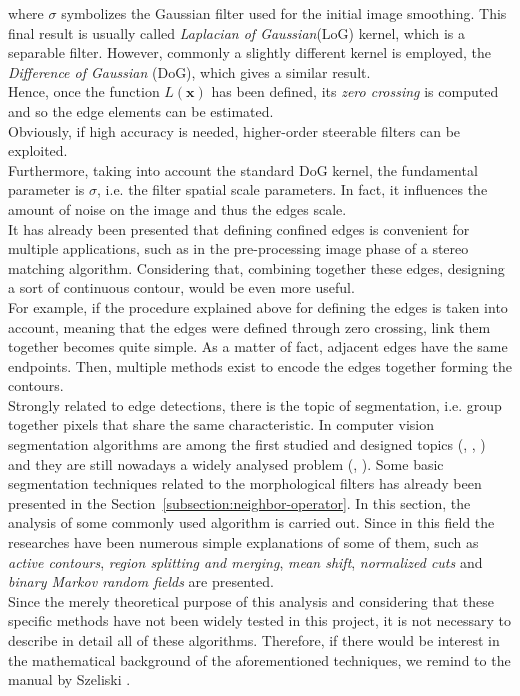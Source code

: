 where $\sigma$ symbolizes the Gaussian filter used for the initial image smoothing.
This final result is usually called \textit{Laplacian of Gaussian}(LoG) kernel, which is a separable filter.
However, commonly a slightly different kernel is employed, the \textit{Difference of Gaussian} (DoG), which gives a similar result.\\
Hence, once the function $L(\mathbf{x})$ has been defined, its \textit{zero crossing} is computed and so the edge elements can be estimated. \\
Obviously, if high accuracy is needed, higher-order steerable filters can be exploited.\\
Furthermore, taking into account the standard DoG kernel, the fundamental parameter is $\sigma$, i.e. the filter spatial scale parameters.
In fact, it influences the amount of noise on the image and thus the edges scale. \\
It has already been presented that defining confined edges is convenient for multiple applications, such as in the pre-processing image phase of a stereo matching algorithm.
Considering that, combining together these edges, designing a sort of continuous contour, would be even more useful.\\
For example, if the procedure explained above for defining the edges is taken into account, meaning that the edges were defined through zero crossing, link them together becomes quite simple. 
As a matter of fact, adjacent edges have the same endpoints. 
Then, multiple methods exist to encode the edges together forming the contours.\\
Strongly related to edge detections, there is the topic of segmentation, i.e. group together pixels that share the same characteristic.
In computer vision segmentation algorithms are among the first studied and designed topics (\cite{ohlander1978picture}, \cite{Brice1970}, \cite{haralick1985image}) and they are still nowadays a widely analysed problem (\cite{comaniciu2002mean}, \cite{cremers2007review}). 
Some basic segmentation techniques related to the morphological filters has already been presented in the Section~\ref{subsection:neighbor-operator}. 
In this section, the analysis of some commonly used algorithm is carried out.
Since in this field the researches have been numerous simple explanations of some of them, such as \textit{active contours}, \textit{region splitting and merging}, \textit{mean shift}, \textit{normalized cuts} and \textit{binary Markov random fields} are presented. \\
Since the merely theoretical purpose of this analysis and considering that these specific methods have not been widely tested in this project, it is not necessary to describe in detail all of these algorithms.
Therefore, if there would be interest in the mathematical background of the aforementioned techniques, we remind to the manual by Szeliski \cite{Szeliski2011}.\\


